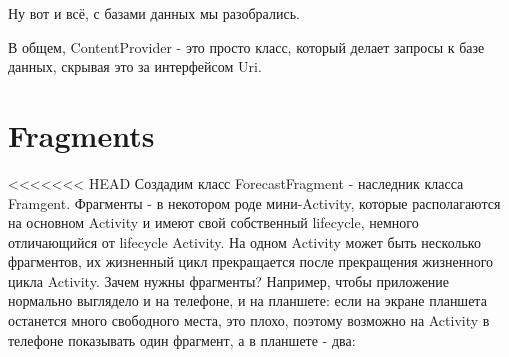 \documentclass[12 pt]{article}
\begin{document}
    Ну вот и всё, с базами данных мы разобрались.
    
    В общем, ContentProvider - это просто класс, который делает запросы к базе данных, скрывая это за интерфейсом Uri.
    
\section{Fragments}
<<<<<<< HEAD
Создадим класс ForecastFragment - наследник класса Framgent.\newline
Фрагменты - в некотором роде мини-Activity, которые располагаются на основном Activity и имеют свой собственный lifecycle, немного отличающийся от lifecycle Activity. На одном Activity может быть несколько фрагментов, их жизненный цикл прекращается после прекращения жизненного цикла Activity.\newline
Зачем нужны фрагменты? Например, чтобы приложение нормально выглядело и на телефоне, и на планшете: если на экране планшета останется много свободного места, это плохо, поэтому возможно на Activity в телефоне показывать один фрагмент, а в планшете - два:\newline
\end{document}
